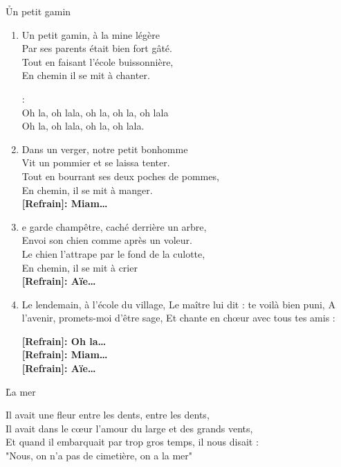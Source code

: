 \documentclass{novel}
\begin{document}
\newpage
\normalsize
\h*{Un petit gamin}

\begin{enumerate}
\item Un petit gamin, à la mine légère \\
Par ses parents était bien fort gâté. \\
Tout en faisant l’école buissonnière, \\
En chemin il se mit à chanter. \\

\begin{bfseries}
[Refrain]:\\
Oh la, oh lala, oh la, oh la, oh lala \\
Oh la, oh lala, oh la, oh lala. \\
\end{bfseries}

\item Dans un verger, notre petit bonhomme \\
Vit un pommier et se laissa tenter. \\
Tout en bourrant ses deux poches de pommes, \\
En chemin, il se mit à manger. \\

\textbf{[Refrain]: Miam…} \\

\item e garde champêtre, caché derrière un arbre, \\
Envoi son chien comme après un voleur. \\
Le chien l’attrape par le fond de la culotte, \\
En chemin, il se mit à crier \\

\textbf{[Refrain]: Aïe…} \\

\item Le lendemain, à l’école du village,
Le maître lui dit : te voilà bien puni,
A l’avenir, promets-moi d’être sage,
Et chante en chœur avec tous tes amis :

\textbf{[Refrain]: Oh la…} \\

\textbf{[Refrain]: Miam…} \\

\textbf{[Refrain]: Aïe…}
\end{enumerate}

\newpage
\large
\h*{La mer}

Il avait une fleur entre les dents, entre les dents, \\
Il avait dans le cœur l'amour du large et des grands vents, \\
Et quand il embarquait par trop gros temps, il nous disait : \\
"Nous, on n'a pas de cimetière, on a la mer" \\
\end{document}

